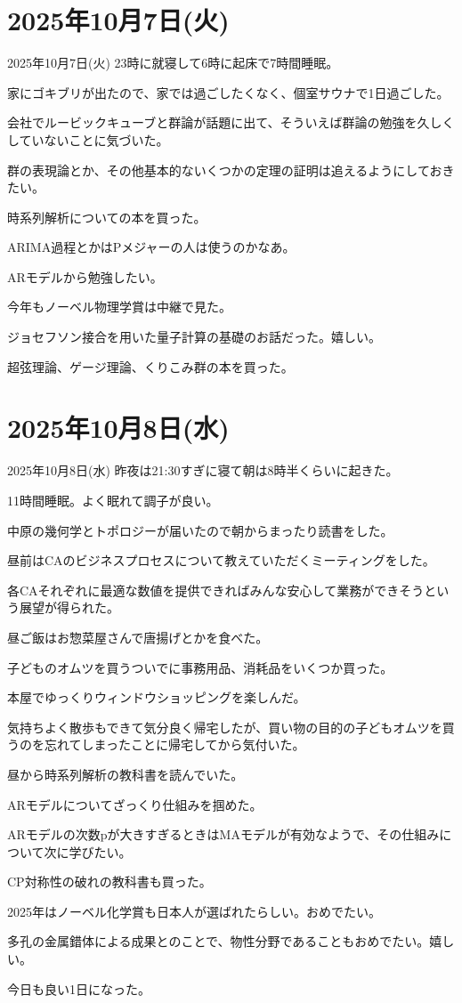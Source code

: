 \documentclass[dvipdfmx, autodetect-engine, aspectratio=169, 10.5pt]{beamer}
\begin{document}
\section{2025年10月7日(火)}

\begin{frame}{2025年10月7日(火)}
23時に就寝して6時に起床で7時間睡眠。

家にゴキブリが出たので、家では過ごしたくなく、個室サウナで1日過ごした。

会社でルービックキューブと群論が話題に出て、そういえば群論の勉強を久しくしていないことに気づいた。

群の表現論とか、その他基本的ないくつかの定理の証明は追えるようにしておきたい。

時系列解析についての本を買った。

ARIMA過程とかはPメジャーの人は使うのかなあ。

ARモデルから勉強したい。

今年もノーベル物理学賞は中継で見た。

ジョセフソン接合を用いた量子計算の基礎のお話だった。嬉しい。

超弦理論、ゲージ理論、くりこみ群の本を買った。
\end{frame}

\section{2025年10月8日(水)}

\begin{frame}{2025年10月8日(水)}
\scriptsize
昨夜は21:30すぎに寝て朝は8時半くらいに起きた。

11時間睡眠。よく眠れて調子が良い。

中原の幾何学とトポロジーが届いたので朝からまったり読書をした。

昼前はCAのビジネスプロセスについて教えていただくミーティングをした。

各CAそれぞれに最適な数値を提供できればみんな安心して業務ができそうという展望が得られた。

昼ご飯はお惣菜屋さんで唐揚げとかを食べた。

子どものオムツを買うついでに事務用品、消耗品をいくつか買った。

本屋でゆっくりウィンドウショッピングを楽しんだ。

気持ちよく散歩もできて気分良く帰宅したが、買い物の目的の子どもオムツを買うのを忘れてしまったことに帰宅してから気付いた。

昼から時系列解析の教科書を読んでいた。

ARモデルについてざっくり仕組みを掴めた。

ARモデルの次数pが大きすぎるときはMAモデルが有効なようで、その仕組みについて次に学びたい。

CP対称性の破れの教科書も買った。

2025年はノーベル化学賞も日本人が選ばれたらしい。おめでたい。

多孔の金属錯体による成果とのことで、物性分野であることもおめでたい。嬉しい。

今日も良い1日になった。
\end{frame}
\end{document}
